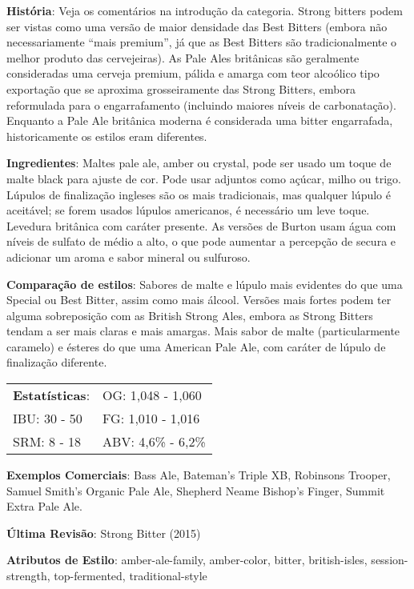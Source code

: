 \textbf{História}: Veja os comentários na introdução da categoria. Strong bitters podem ser vistas como uma versão de maior densidade das Best Bitters (embora não necessariamente “mais premium”, já que as Best Bitters são tradicionalmente o melhor produto das cervejeiras). As Pale Ales britânicas são geralmente consideradas uma cerveja premium, pálida e amarga com teor alcoólico tipo exportação que se aproxima grosseiramente das Strong Bitters, embora reformulada para o engarrafamento (incluindo maiores níveis de carbonatação). Enquanto a Pale Ale britânica moderna é considerada uma bitter engarrafada, historicamente os estilos eram diferentes.

\textbf{Ingredientes}: Maltes pale ale, amber ou crystal, pode ser usado um toque de malte black para ajuste de cor. Pode usar adjuntos como açúcar, milho ou trigo. Lúpulos de finalização ingleses são os mais tradicionais, mas qualquer lúpulo é aceitável; se forem usados lúpulos americanos, é necessário um leve toque. Levedura britânica com caráter presente. As versões de Burton usam água com níveis de sulfato de médio a alto, o que pode aumentar a percepção de secura e adicionar um aroma e sabor mineral ou sulfuroso.

\textbf{Comparação de estilos}: Sabores de malte e lúpulo mais evidentes do que uma Special ou Best Bitter, assim como mais álcool. Versões mais fortes podem ter alguma sobreposição com as British Strong Ales, embora as Strong Bitters tendam a ser mais claras e mais amargas. Mais sabor de malte (particularmente caramelo) e ésteres do que uma American Pale Ale, com caráter de lúpulo de finalização diferente.

\begin{tabular}{@{}p{35mm}p{35mm}@{}}
  \textbf{Estatísticas}: & OG: 1,048 - 1,060 \\
  IBU: 30 - 50  & FG: 1,010 - 1,016  \\
  SRM: 8 - 18  & ABV: 4,6\% - 6,2\%
\end{tabular}

\textbf{Exemplos Comerciais}: Bass Ale, Bateman’s Triple XB, Robinsons Trooper, Samuel Smith’s Organic Pale Ale, Shepherd Neame Bishop's Finger, Summit Extra Pale Ale.

\textbf{Última Revisão}: Strong Bitter (2015)

\textbf{Atributos de Estilo}: amber-ale-family, amber-color, bitter, british-isles, session-strength, top-fermented, traditional-style